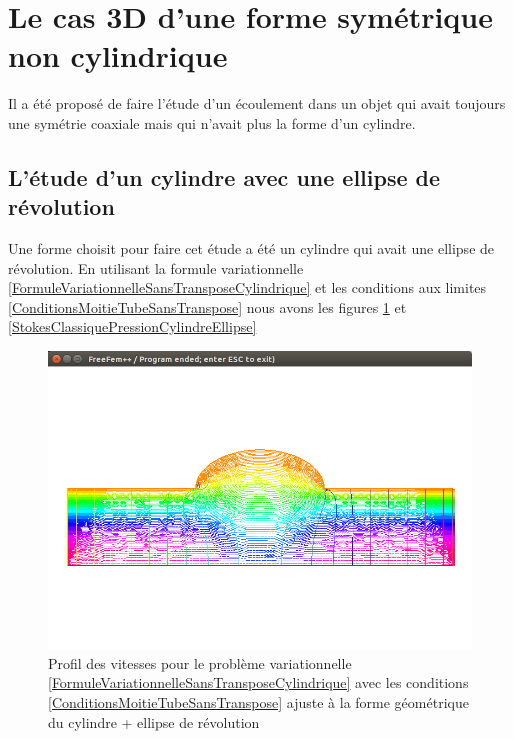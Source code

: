 \documentclass[11pt,a4paper]{article}
\numberwithin{equation}{subsection}
\numberwithin{figure}{subsection}
\begin{document}
%
%
\section{Le cas 3D d'une forme symétrique non cylindrique}

Il a été proposé de faire l'étude d'un écoulement dans un objet qui avait toujours une symétrie coaxiale mais qui n'avait plus la forme d'un cylindre. 

\subsection{L'étude d'un cylindre avec une ellipse de révolution}

Une forme choisit pour faire cet étude a été un cylindre qui avait une ellipse de révolution. En utilisant la formule variationnelle \ref{FormuleVariationnelleSansTransposeCylindrique} et les conditions aux limites \ref{ConditionsMoitieTubeSansTranspose} nous avons les figures \ref{StokesClassiqueVitessesCylindreEllipse} et \ref{StokesClassiquePressionCylindreEllipse}

\begin{figure}[h]
\centering
\includegraphics[scale=0.4]{StokesClassiqueVitessesCylindreEllipse.png}
\caption{Profil des vitesses pour le problème variationnelle \ref{FormuleVariationnelleSansTransposeCylindrique} avec les conditions \ref{ConditionsMoitieTubeSansTranspose} ajuste à la forme géométrique du cylindre + ellipse de révolution}
\label{StokesClassiqueVitessesCylindreEllipse}
\end{figure}
\end{document}
